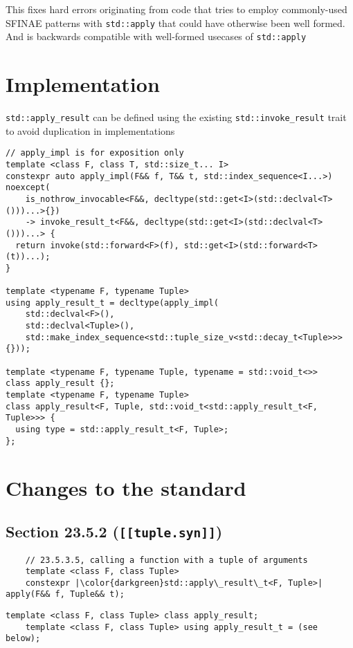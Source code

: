 \documentclass{article}
\begin{document}
This fixes hard errors originating from code that tries to employ commonly-used
SFINAE patterns with \texttt{std::apply} that could have otherwise been well
formed.  And is backwards compatible with well-formed usecases of
\texttt{std::apply}

\section{Implementation}
\texttt{std::apply\_result} can be defined using the existing
\texttt{std::invoke\_result} trait to avoid duplication in implementations

\begin{lstlisting}
// apply_impl is for exposition only
template <class F, class T, std::size_t... I>
constexpr auto apply_impl(F&& f, T&& t, std::index_sequence<I...>) noexcept(
    is_nothrow_invocable<F&&, decltype(std::get<I>(std::declval<T>()))...>{})
    -> invoke_result_t<F&&, decltype(std::get<I>(std::declval<T>()))...> {
  return invoke(std::forward<F>(f), std::get<I>(std::forward<T>(t))...);
}

template <typename F, typename Tuple>
using apply_result_t = decltype(apply_impl(
    std::declval<F>(),
    std::declval<Tuple>(),
    std::make_index_sequence<std::tuple_size_v<std::decay_t<Tuple>>>{}));

template <typename F, typename Tuple, typename = std::void_t<>>
class apply_result {};
template <typename F, typename Tuple>
class apply_result<F, Tuple, std::void_t<std::apply_result_t<F, Tuple>>> {
  using type = std::apply_result_t<F, Tuple>;
};
\end{lstlisting}

\section{Changes to the standard}
\subsection{Section 23.5.2 (\texttt{[[tuple.syn]]})}
\begin{lstlisting}
    // 23.5.3.5, calling a function with a tuple of arguments
    template <class F, class Tuple>
    constexpr |\color{darkgreen}std::apply\_result\_t<F, Tuple>| apply(F&& f, Tuple&& t);
\end{lstlisting}
\begin{lstlisting}[style=base]
    template <class F, class Tuple> class apply_result;
    template <class F, class Tuple> using apply_result_t = (see below);
\end{lstlisting}
\end{document}
